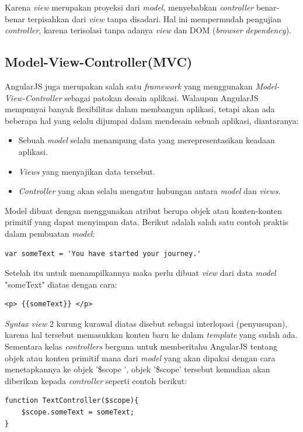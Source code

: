 	Karena \textit{view} merupakan proyeksi dari \textit{model}, menyebabkan \textit{controller} benar-benar terpisahkan dari \textit{view} tanpa disadari. Hal ini mempermudah pengujian \textit{controller}, karena terisolasi tanpa adanya \textit{view} dan DOM (\textit{browser dependency}).
	
\subsection{Model-View-Controller(MVC)}
\label{sub: mvcAngular}

	AngularJS\cite{green2013angularjs} juga merupakan salah satu \textit{framework} yang menggunakan  \textit{Model-View-Controller} sebagai patokan desain aplikasi. Walaupun AngularJS mempunyai banyak flexibilitas dalam membangun aplikasi, tetapi akan ada beberapa hal yang selalu dijumpai dalam mendesain sebuah aplikasi, diantaranya:
	\begin{itemize}
		\item Sebuah \textit{model} selalu menampung data yang merepresentasikan keadaan aplikasi.
		\item \textit{Views} yang menyajikan data tersebut.
		\item \textit{Controller} yang akan selalu mengatur hubungan antara \textit{model} dan \textit{views}.
	\end{itemize}
	
	Model dibuat dengan menggunakan atribut berupa objek atau konten-konten primitif yang dapat menyimpan data. Berikut adalah salah satu contoh praktis dalam pembuatan \textit{model}:
\begin{lstlisting}[caption= Model berupa variabel]
var someText = 'You have started your journey.'
\end{lstlisting}
	Setelah itu untuk menampilkannya maka perlu dibuat \textit{view} dari data \textit{model} "someText" diatas dengan cara:
\begin{lstlisting}[caption= Menampilkan model]
<p> {{someText}} </p>
\end{lstlisting}
	\textit{Syntax view} 2 kurung kurawal diatas disebut sebagai interlopasi (penyusupan), karena hal tersebut memasukkan konten baru ke dalam \textit{template} yang sudah ada.\\
	Sementara kelas \textit{controllers} berguna untuk memberitahu AngularJS tentang objek atau konten primitif mana dari \textit{model} yang akan dipakai dengan cara menetapkannya ke objek '\$scope ', objek '\$scope' tersebut kemudian akan diberikan kepada \textit{controller} seperti contoh berikut:
\begin{lstlisting}[caption= Controller , label= listController]
function TextController($scope){
	$scope.someText = someText;
}
\end{lstlisting}
	
